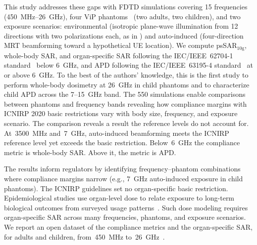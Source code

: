 \documentclass{iopjournal}
\begin{document}
This study addresses these gaps with \gls{FDTD} simulations covering 15 frequencies (450~MHz--26~GHz), four \gls{ViP} phantoms~\citep{gosselin2014development} (two adults, two children), and two exposure scenarios: environmental (isotropic plane-wave illumination from 12 directions with two polarizations each, as in \citet{bakker2010children,uusitupa2010sar}) and auto-induced (four-direction \gls{MRT} beamforming toward a hypothetical \gls{UE} location).
We compute psSAR$_{10\mathrm{g}}$, whole-body \gls{SAR}, and organ-specific \gls{SAR} following the IEC/IEEE~62704-1 standard~\citep{iec62704} below 6~GHz, and \gls{APD} following the IEC/IEEE~63195-4 standard~\citep{iec63195} at or above 6~GHz.
To the best of the authors' knowledge, this is the first study to perform whole-body dosimetry at 26~GHz in child phantoms and to characterize child \gls{APD} across the 7--15~GHz band.
The 550 simulations enable comparisons between phantoms and frequency bands revealing how compliance margins with \gls{ICNIRP} 2020 basic restrictions vary with body size, frequency, and exposure scenario.
The comparison reveals a result the reference levels do not account for.
At~3500~MHz and~7~GHz, auto-induced beamforming meets the \gls{ICNIRP} reference level yet exceeds the basic restriction.
Below~6~GHz the compliance metric is whole-body \gls{SAR}. Above it, the metric is \gls{APD}.

The results inform regulators by identifying frequency--phantom combinations where compliance margins narrow (e.g., 7~GHz auto-induced exposure in child phantoms).
The \gls{ICNIRP} guidelines set no organ-specific basic restriction.
Epidemiological studies use organ-level dose to relate exposure to long-term biological outcomes from surveyed usage patterns~\citep{vanwel2021organ,liorni2020evaluation,birks2021dose}.
Such dose modeling requires organ-specific \gls{SAR} across many frequencies, phantoms, and exposure scenarios.
We report an open dataset of the compliance metrics and the organ-specific \gls{SAR}, for adults and children, from~450~MHz to~26~GHz~\citep{goliat2023}.

\end{document}
